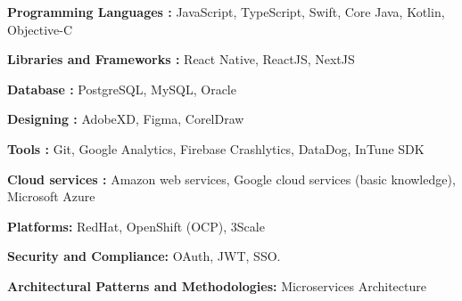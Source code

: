 


\begin{itemize}
\small{
    \item \textbf{Programming Languages : }JavaScript, TypeScript, Swift, Core Java, Kotlin, Objective-C
    \item \textbf{Libraries and Frameworks : }React Native, ReactJS, NextJS
    \item \textbf{Database : }PostgreSQL, MySQL, Oracle
    \item \textbf{Designing : }AdobeXD, Figma, CorelDraw
    \item \textbf{Tools : }Git, Google Analytics, Firebase Crashlytics, DataDog, InTune SDK
    \item \textbf{Cloud services : }Amazon web services, Google cloud services (basic knowledge), Microsoft Azure
    \item \textbf{Platforms: }RedHat, OpenShift (OCP), 3Scale
    \item \textbf{Security and Compliance: }OAuth, JWT, SSO.
    \item \textbf{Architectural Patterns and Methodologies: }Microservices Architecture
    }
\end{itemize}